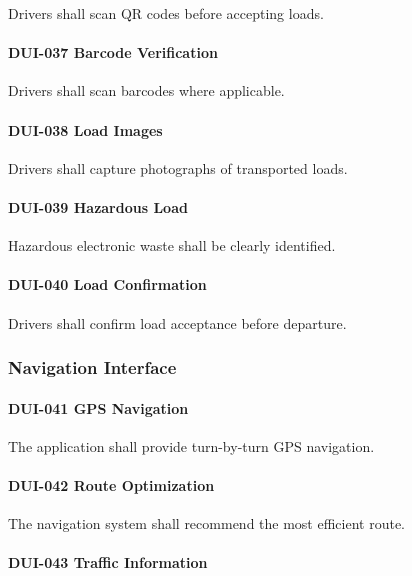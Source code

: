 Drivers shall scan QR codes before accepting loads.

\paragraph{DUI-037 Barcode Verification}

Drivers shall scan barcodes where applicable.

\paragraph{DUI-038 Load Images}

Drivers shall capture photographs of transported loads.

\paragraph{DUI-039 Hazardous Load}

Hazardous electronic waste shall be clearly identified.

\paragraph{DUI-040 Load Confirmation}

Drivers shall confirm load acceptance before departure.


\subsubsection*{Navigation Interface}

\paragraph{DUI-041 GPS Navigation}

The application shall provide turn-by-turn GPS navigation.

\paragraph{DUI-042 Route Optimization}

The navigation system shall recommend the most efficient route.

\paragraph{DUI-043 Traffic Information}

